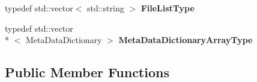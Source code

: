 \begin{DoxyCompactItemize}
\item 
\hypertarget{classitk_1_1_read_file_list_filter_a7af1edf01cc01792c71e4be6e619bb5a}{typedef std\-::vector$<$ std\-::string $>$ {\bfseries File\-List\-Type}}\label{classitk_1_1_read_file_list_filter_a7af1edf01cc01792c71e4be6e619bb5a}

\item 
\hypertarget{classitk_1_1_read_file_list_filter_a919eb75a344b8f701f05a8dcb94b62fe}{typedef std\-::vector\\*
$<$ Meta\-Data\-Dictionary $>$ {\bfseries Meta\-Data\-Dictionary\-Array\-Type}}\label{classitk_1_1_read_file_list_filter_a919eb75a344b8f701f05a8dcb94b62fe}

\end{DoxyCompactItemize}
\subsection*{Public Member Functions}
